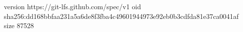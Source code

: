 version https://git-lfs.github.com/spec/v1
oid sha256:dd168bbfaa231a5a6de8f3fba4c49601944973e92eb0b3cdfda81e37ca0041af
size 87528

